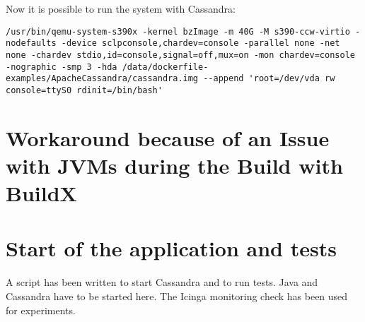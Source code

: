 Now it is possible to run the system with Cassandra: \\
\begin{lstlisting}[style=BashInputStyle]
 /usr/bin/qemu-system-s390x -kernel bzImage -m 40G -M s390-ccw-virtio -nodefaults -device sclpconsole,chardev=console -parallel none -net none -chardev stdio,id=console,signal=off,mux=on -mon chardev=console -nographic -smp 3 -hda /data/dockerfile-examples/ApacheCassandra/cassandra.img --append 'root=/dev/vda rw console=ttyS0 rdinit=/bin/bash' 
 \end{lstlisting}
 
\section{Workaround because of an Issue with JVMs during the Build with BuildX}

\section{Start of the application and tests}

A script has been written to start Cassandra and to run tests. Java and Cassandra have to be started here. The Icinga monitoring check has been used for experiments.
